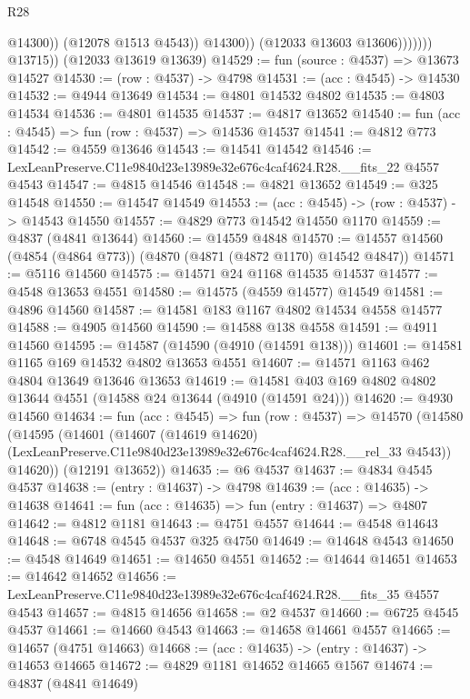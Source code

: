 \begin{lexlean}{R28}
\begin{coremodule}
                              @14300))
                          (@12078 @1513 @4543))
                        @14300))
                    (@12033 @13603 @13606)))))))
        @13715))
    (@12033 @13619 @13639)
@14529 := fun (source : @4537) => @13673 @14527
@14530 := (row : @4537) -> @4798
@14531 := (acc : @4545) -> @14530
@14532 := @4944 @13649
@14534 := @4801 @14532 @4802
@14535 := @4803 @14534
@14536 := @4801 @14535
@14537 := @4817 @13652
@14540 := fun (acc : @4545) => fun (row : @4537) => @14536 @14537
@14541 := @4812 @773
@14542 := @4559 @13646
@14543 := @14541 @14542
@14546 := LexLeanPreserve.C11e9840d23e13989e32e676c4caf4624.R28.__fits_22 @4557 @4543
@14547 := @4815 @14546
@14548 := @4821 @13652
@14549 := @325 @14548
@14550 := @14547 @14549
@14553 := (acc : @4545) -> (row : @4537) -> @14543 @14550
@14557 := @4829 @773 @14542 @14550 @1170
@14559 := @4837 (@4841 @13644)
@14560 := @14559 @4848
@14570 := @14557 @14560 (@4854 (@4864 @773)) (@4870 (@4871 (@4872 @1170) @14542 @4847))
@14571 := @5116 @14560
@14575 := @14571 @24 @1168 @14535 @14537
@14577 := @4548 @13653 @4551
@14580 := @14575 (@4559 @14577) @14549
@14581 := @4896 @14560
@14587 := @14581 @183 @1167 @4802 @14534 @4558 @14577
@14588 := @4905 @14560
@14590 := @14588 @138 @4558
@14591 := @4911 @14560
@14595 := @14587 (@14590 (@4910 (@14591 @138)))
@14601 := @14581 @1165 @169 @14532 @4802 @13653 @4551
@14607 := @14571 @1163 @462 @4804 @13649 @13646 @13653
@14619 := @14581 @403 @169 @4802 @4802 @13644 @4551 (@14588 @24 @13644 (@4910 (@14591 @24)))
@14620 := @4930 @14560
@14634 := fun (acc : @4545) =>
  fun (row : @4537) =>
  @14570
    (@14580
      (@14595
        (@14601
          (@14607
            (@14619 @14620)
            (LexLeanPreserve.C11e9840d23e13989e32e676c4caf4624.R28.__rel_33 @4543))
          @14620))
      (@12191 @13652))
@14635 := @6 @4537
@14637 := @4834 @4545 @4537
@14638 := (entry : @14637) -> @4798
@14639 := (acc : @14635) -> @14638
@14641 := fun (acc : @14635) => fun (entry : @14637) => @4807
@14642 := @4812 @1181
@14643 := @4751 @4557
@14644 := @4548 @14643
@14648 := @6748 @4545 @4537 @325 @4750
@14649 := @14648 @4543
@14650 := @4548 @14649
@14651 := @14650 @4551
@14652 := @14644 @14651
@14653 := @14642 @14652
@14656 := LexLeanPreserve.C11e9840d23e13989e32e676c4caf4624.R28.__fits_35 @4557 @4543
@14657 := @4815 @14656
@14658 := @2 @4537
@14660 := @6725 @4545 @4537
@14661 := @14660 @4543
@14663 := @14658 @14661 @4557
@14665 := @14657 (@4751 @14663)
@14668 := (acc : @14635) -> (entry : @14637) -> @14653 @14665
@14672 := @4829 @1181 @14652 @14665 @1567
@14674 := @4837 (@4841 @14649)

\end{coremodule}
\end{lexlean}
